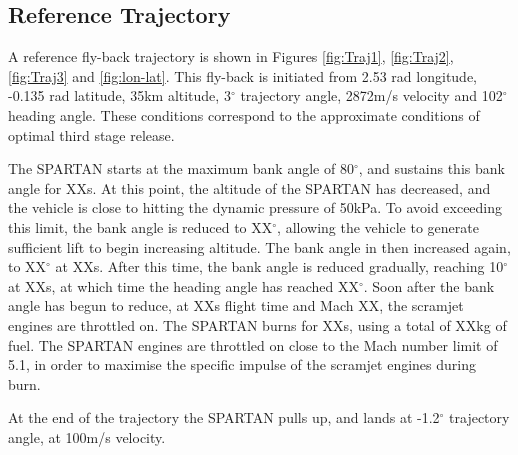 \documentclass[conf]{new-aiaa}
\begin{document}
\subsection{Reference Trajectory}

A reference fly-back trajectory is shown in Figures \ref{fig:Traj1}, \ref{fig:Traj2}, \ref{fig:Traj3} and \ref{fig:lon-lat}. This fly-back is initiated from 2.53 rad longitude, -0.135 rad latitude, 35km altitude, 3$^\circ$ trajectory angle, 2872m/s velocity and 102$^\circ$ heading angle. These conditions correspond to the approximate conditions of optimal third stage release. 

The SPARTAN starts at the maximum bank angle of 80$^\circ$, and sustains this bank angle for XXs. At this point, the altitude of the SPARTAN has decreased, and the vehicle is close to hitting the dynamic pressure of 50kPa. To avoid exceeding this limit, the bank angle is reduced to XX$^\circ$, allowing the vehicle to generate sufficient lift to begin increasing altitude. The bank angle in then increased again, to XX$^\circ$ at XXs. After this time, the bank angle is reduced gradually, reaching 10$^\circ$ at XXs, at which time the heading angle has reached XX$^\circ$. Soon after the bank angle has begun to reduce, at XXs flight time and Mach XX, the scramjet engines are throttled on. The SPARTAN burns for XXs, using a total of XXkg of fuel. The SPARTAN engines are throttled on close to the Mach number limit of 5.1, in order to maximise the specific impulse of the scramjet engines during burn. 


 At the end of the trajectory the SPARTAN pulls up, and lands at -1.2$^\circ$ trajectory angle, at 100m/s velocity. 
\end{document}

